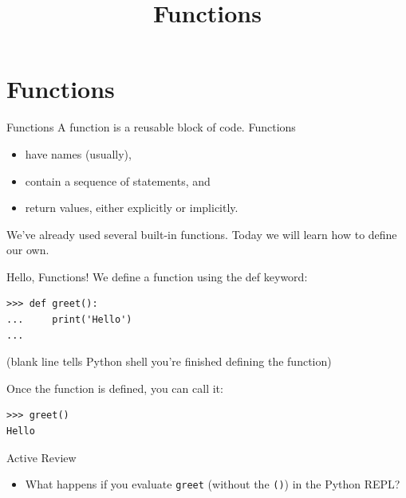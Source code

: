 \documentclass[smaller, aspectratio=1610]{beamer}
\date{}
\title{Functions}
\begin{document}
\maketitle

\section{Functions}
\label{sec:org6fd5a5c}

\begin{frame}[label={sec:org4fb60c1}]{Functions}
A function is a reusable block of code. Functions

\begin{itemize}
\item have names (usually),
\item contain a sequence of statements, and
\item return values, either explicitly or implicitly.
\end{itemize}

We've already used several built-in functions. Today we will learn how to define our own.
\end{frame}

\begin{frame}[label={sec:org7d4e4bc},fragile]{Hello, Functions!}
 We define a function using the def keyword:

\lstset{language=Python,label= ,caption= ,captionpos=b,numbers=none}
\begin{lstlisting}
>>> def greet():
...     print('Hello')
...
\end{lstlisting}

(blank line tells Python shell you're finished defining the function)

Once the function is defined, you can call it:

\lstset{language=Python,label= ,caption= ,captionpos=b,numbers=none}
\begin{lstlisting}
>>> greet()
Hello
\end{lstlisting}

\begin{block}{Active Review}
\begin{itemize}
\item What happens if you evaluate \texttt{greet} (without the \texttt{()}) in the Python REPL?
\end{itemize}
\end{block}
\end{frame}
\end{document}
